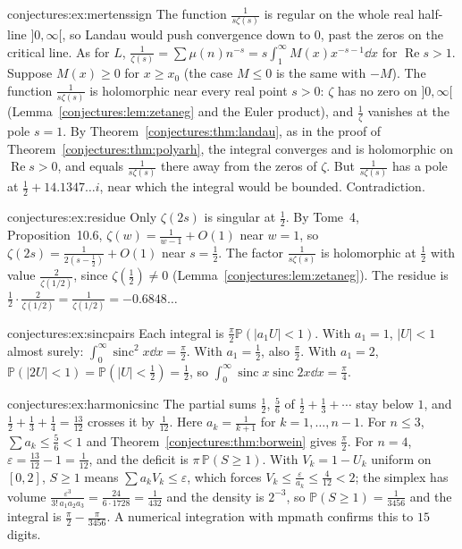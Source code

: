 \begin{solution}{conjectures:ex:mertenssign}
\idea The function $\frac1{s\zeta(s)}$ is regular on the whole real half-line $]0,\infty[$, so Landau would push convergence down to $0$, past the zeros on the
critical line.
\writeup As for $L$, $\frac1{\zeta(s)}=\sum\mu(n)n^{-s}=s\int_1^\infty M(x)x^{-s-1}\dd x$ for $\operatorname{Re}s>1$. Suppose $M(x)\ge0$ for $x\ge x_0$ (the case
$M\le0$ is the same with $-M$). The function $\frac1{s\zeta(s)}$ is holomorphic near every real point $s>0$: $\zeta$ has no zero on $]0,\infty[$ (Lemma~\ref{conjectures:lem:zetaneg}
and the Euler product), and $\frac1\zeta$ vanishes at the pole $s=1$. By Theorem~\ref{conjectures:thm:landau}, as in the proof of Theorem~\ref{conjectures:thm:polyarh}, the integral
converges and is holomorphic on $\operatorname{Re}s>0$, and equals $\frac1{s\zeta(s)}$ there away from the zeros of $\zeta$. But $\frac1{s\zeta(s)}$ has a pole at
$\frac12+14.1347\ldots i$, near which the integral would be bounded. Contradiction.
\end{solution}

\begin{solution}{conjectures:ex:residue}
\idea Only $\zeta(2s)$ is singular at $\frac12$.
\writeup By Tome~4, Proposition~10.6, $\zeta(w)=\frac1{w-1}+O(1)$ near $w=1$, so $\zeta(2s)=\frac1{2(s-\frac12)}+O(1)$ near $s=\frac12$. The factor $\frac1{s\zeta(s)}$
is holomorphic at $\frac12$ with value $\frac2{\zeta(1/2)}$, since $\zeta(\frac12)\ne0$ (Lemma~\ref{conjectures:lem:zetaneg}). The residue is $\frac12\cdot\frac2{\zeta(1/2)}=\frac1{\zeta(1/2)}=-0.6848\ldots$
\end{solution}

\begin{solution}{conjectures:ex:sincpairs}
\idea Each integral is $\frac\pi2\mathbb P(|a_1U|<1)$.
\writeup With $a_1=1$, $|U|<1$ almost surely: $\int_0^\infty\operatorname{sinc}^2x\dd x=\frac\pi2$. With $a_1=\frac12$, also $\frac\pi2$. With $a_1=2$,
$\mathbb P(|2U|<1)=\mathbb P(|U|<\frac12)=\frac12$, so $\int_0^\infty\operatorname{sinc}x\operatorname{sinc}2x\dd x=\frac\pi4$.
\end{solution}

\begin{solution}{conjectures:ex:harmonicsinc}
\idea The partial sums $\frac12$, $\frac56$ of $\frac12+\frac13+\cdots$ stay below $1$, and $\frac12+\frac13+\frac14=\frac{13}{12}$ crosses it by $\frac1{12}$.
\writeup Here $a_k=\frac1{k+1}$ for $k=1,\dots,n-1$. For $n\le3$, $\sum a_k\le\frac56<1$ and Theorem~\ref{conjectures:thm:borwein} gives $\frac\pi2$. For $n=4$,
$\varepsilon=\frac{13}{12}-1=\frac1{12}$, and the deficit is $\pi\,\mathbb P(S\ge1)$. With $V_k=1-U_k$ uniform on $[0,2]$, $S\ge1$ means $\sum a_kV_k\le\varepsilon$,
which forces $V_k\le\frac\varepsilon{a_k}\le\frac4{12}<2$; the simplex has volume $\frac{\varepsilon^3}{3!\,a_1a_2a_3}=\frac{24}{6\cdot1728}=\frac1{432}$ and the density is
$2^{-3}$, so $\mathbb P(S\ge1)=\frac1{3456}$ and the integral is $\frac\pi2-\frac\pi{3456}$. A numerical integration with mpmath confirms this to $15$ digits.
\end{solution}

